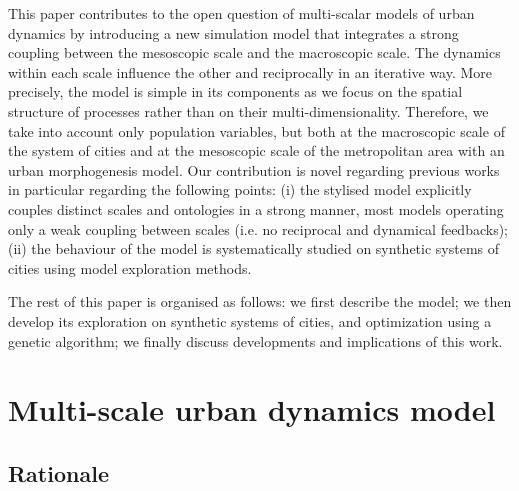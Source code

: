 \documentclass[referee,lineno,pdflatex,sn-apa]{sn-jnl}
\begin{document}

This paper contributes to the open question of multi-scalar models of urban dynamics by introducing a new simulation model that integrates a strong coupling between the mesoscopic scale and the macroscopic scale. The dynamics within each scale influence the other and reciprocally in an iterative way. More precisely, the model is simple in its components as we focus on the spatial structure of processes rather than on their multi-dimensionality. Therefore, we take into account only population variables, but both at the macroscopic scale of the system of cities and at the mesoscopic scale of the metropolitan area with an urban morphogenesis model. Our contribution is novel regarding previous works in particular regarding the following points: (i) the stylised model explicitly couples distinct scales and ontologies in a strong manner, most models operating only a weak coupling between scales (i.e. no reciprocal and dynamical feedbacks); (ii) the behaviour of the model is systematically studied on synthetic systems of cities using model exploration methods.
 
 
The rest of this paper is organised as follows: we first describe the model; we then develop its exploration on synthetic systems of cities, and optimization using a genetic algorithm; we finally discuss developments and implications of this work.


\section{Multi-scale urban dynamics model}

\subsection{Rationale}
\end{document}
